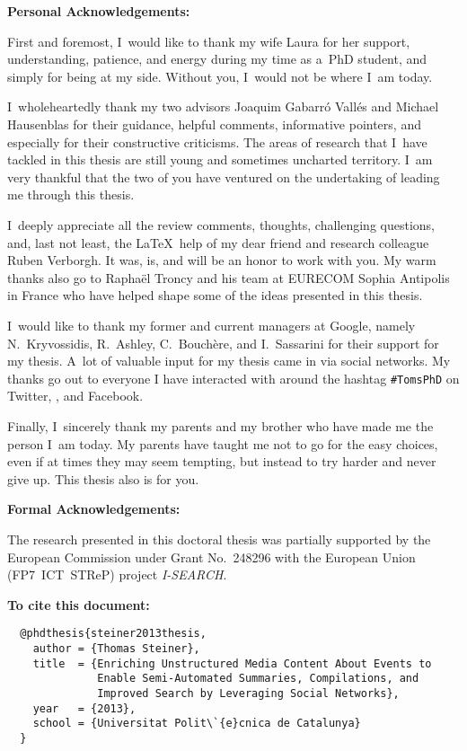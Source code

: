 \begin{acknowledgements}

\textbf{Personal Acknowledgements:}

First and foremost, I~would like to thank my wife Laura
for her support, understanding, patience, and energy
during my time as a~PhD student, and simply for being at my side.
Without you, I~would not be where I~am today.

I~wholeheartedly thank my two advisors Joaquim Gabarró Vallés
and Michael Hausenblas for their guidance, helpful comments,
informative pointers, and especially
for their constructive criticisms.
The areas of research that I~have tackled in this thesis
are still young and sometimes uncharted territory.
I~am very thankful that the two of you have ventured
on the undertaking of leading me through this thesis.

I~deeply appreciate all the review comments, thoughts, challenging questions,
and, last not least, the \LaTeX~help of my dear friend
and research colleague Ruben Verborgh.
It was, is, and will be an honor to work with you.
My warm thanks also go to Raphaël Troncy and his team
at \mbox{EURECOM} Sophia Antipolis in France
who have helped shape some of the ideas presented in this thesis.

I~would like to thank my former and current managers at Google,
namely N.~Kryvossidis, R.~Ashley, C.~Bouchère, and I.~Sassarini
for their support for my thesis.
A~lot of valuable input for my thesis came in via social networks.
My thanks go out to everyone I have interacted with
around the hashtag \texttt{\#TomsPhD}
on Twitter, \googleplus, and Facebook.

Finally, I~sincerely thank my parents and my brother
who have made me the person I~am today.
My parents have taught me
not to go for the easy choices, even
if at times they may seem tempting,
but instead to try harder and never give up.
This thesis also is for you.

\textbf{Formal Acknowledgements:}

The research presented in this doctoral thesis
was partially supported by the European Commission
under Grant No.~248296 with the European Union (FP7~ICT~STReP)
project \mbox{\emph{I-SEARCH}}.

\vspace{80mm}

\textbf{To cite this document:}

\small
\begin{verbatim}
  @phdthesis{steiner2013thesis,
    author = {Thomas Steiner},
    title  = {Enriching Unstructured Media Content About Events to
              Enable Semi-Automated Summaries, Compilations, and
              Improved Search by Leveraging Social Networks},
    year   = {2013},
    school = {Universitat Polit\`{e}cnica de Catalunya}
  }
\end{verbatim}


\end{acknowledgements}
